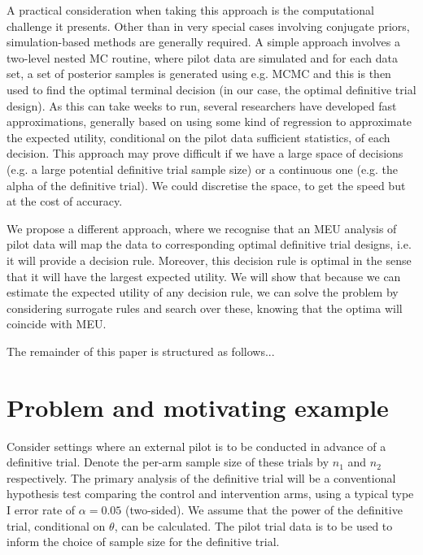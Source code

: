 \documentclass[sagev, Crown]{sagej} %
\begin{document}
A practical consideration when taking this approach is the computational challenge it presents. Other than in very special cases involving conjugate priors, simulation-based methods are generally required. A simple approach involves a two-level nested MC routine, where pilot data are simulated and for each data set, a set of posterior samples is generated using e.g. MCMC and this is then used to find the optimal terminal decision (in our case, the optimal definitive trial design). As this can take weeks to run, several researchers have developed fast approximations, generally based on using some kind of regression to approximate the expected utility, conditional on the pilot data sufficient statistics, of each decision. This approach may prove difficult if we have a large space of decisions (e.g. a large potential definitive trial sample size) or a continuous one (e.g. the alpha of the definitive trial). We could discretise the space, to get the speed but at the cost of accuracy.
\cite{Strong2014}
\cite{Strong2015}
\cite{Menzies2015}
\cite{Heath2017}
\cite{Jalal2017}
\cite{Heath2019}

We propose a different approach, where we recognise that an MEU analysis of pilot data will map the data to corresponding optimal definitive trial designs, i.e. it will provide a decision rule. Moreover, this decision rule is optimal in the sense that it will have the largest expected utility. We will show that because we can estimate the expected utility of any decision rule, we can solve the problem by considering surrogate rules and search over these, knowing that the optima will coincide with MEU. 

The remainder of this paper is structured as follows...

\section{Problem and motivating example}\label{sec:problem}

Consider settings where an external pilot is to be conducted in advance of a definitive trial. Denote the per-arm sample size of these trials by $n_1$ and $n_2$ respectively. The primary analysis of the definitive trial will be a conventional hypothesis test comparing the control and intervention arms, using a typical type I error rate of $\alpha = 0.05$ (two-sided). We assume that the power of the definitive trial, conditional on $\theta$, can be calculated. The pilot trial data is to be used to inform the choice of sample size for the definitive trial.
\end{document}
